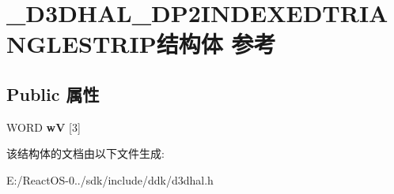 \hypertarget{struct___d3_d_h_a_l___d_p2_i_n_d_e_x_e_d_t_r_i_a_n_g_l_e_s_t_r_i_p}{}\section{\+\_\+\+D3\+D\+H\+A\+L\+\_\+\+D\+P2\+I\+N\+D\+E\+X\+E\+D\+T\+R\+I\+A\+N\+G\+L\+E\+S\+T\+R\+I\+P结构体 参考}
\label{struct___d3_d_h_a_l___d_p2_i_n_d_e_x_e_d_t_r_i_a_n_g_l_e_s_t_r_i_p}
\subsection*{Public 属性}
\begin{DoxyCompactItemize}
\item 
\mbox{\label{struct___d3_d_h_a_l___d_p2_i_n_d_e_x_e_d_t_r_i_a_n_g_l_e_s_t_r_i_p_a21be7f9383ecefe980097b58d6cf0b99}} 
W\+O\+RD {\bfseries wV} \mbox{[}3\mbox{]}
\end{DoxyCompactItemize}


该结构体的文档由以下文件生成\+:\begin{DoxyCompactItemize}
\item 
E\+:/\+React\+O\+S-\/0../sdk/include/ddk/d3dhal.\+h\end{DoxyCompactItemize}
